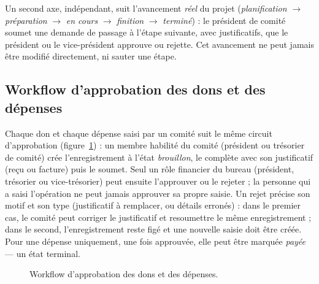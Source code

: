 Un second axe, indépendant, suit l'avancement \emph{réel} du projet
(\emph{planification} $\rightarrow$ \emph{préparation} $\rightarrow$ \emph{en
cours} $\rightarrow$ \emph{finition} $\rightarrow$ \emph{terminé}) : le
président de comité soumet une demande de passage à l'étape suivante, avec
justificatifs, que le président ou le vice-président approuve ou rejette.
Cet avancement ne peut jamais être modifié directement, ni sauter une étape.

\subsection{Workflow d'approbation des dons et des dépenses}

Chaque don et chaque dépense saisi par un comité suit le même circuit
d'approbation (figure~\ref{fig:approbation}) : un membre habilité du comité
(président ou trésorier de comité) crée l'enregistrement à l'état
\emph{brouillon}, le complète avec son justificatif (reçu ou facture) puis le
soumet. Seul un rôle financier du bureau (président, trésorier ou
vice-trésorier) peut ensuite l'approuver ou le rejeter ; la personne qui a
saisi l'opération ne peut jamais approuver sa propre saisie. Un rejet précise
son motif et son type (justificatif à remplacer, ou détails erronés) : dans
le premier cas, le comité peut corriger le justificatif et resoumettre le
même enregistrement ; dans le second, l'enregistrement reste figé et une
nouvelle saisie doit être créée. Pour une dépense uniquement, une fois
approuvée, elle peut être marquée \emph{payée} — un état terminal.

\begin{figure}[htbp]
  \centering
  \caption{Workflow d'approbation des dons et des dépenses.}
  \label{fig:approbation}
\end{figure}

